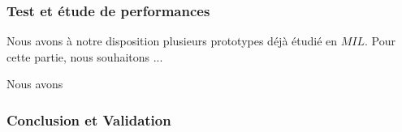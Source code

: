 		\subsubsection{Test et étude de performances}
		Nous avons à notre disposition plusieurs prototypes déjà étudié en $MIL$. Pour cette partie, nous souhaitons ...
		
		Nous avons 
		\subsubsection{Conclusion et Validation}
		
